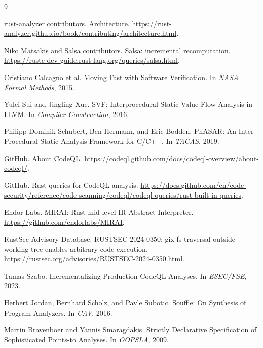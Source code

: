 \documentclass[sigconf,nonacm]{acmart}
\begin{document}
\begin{thebibliography}{9}

rust-analyzer contributors.
\newblock Architecture.
\newblock \url{https://rust-analyzer.github.io/book/contributing/architecture.html}.

Niko Matsakis and Salsa contributors.
\newblock Salsa: incremental recomputation.
\newblock \url{https://rustc-dev-guide.rust-lang.org/queries/salsa.html}.

Cristiano Calcagno et al.
\newblock Moving Fast with Software Verification.
\newblock In \emph{NASA Formal Methods}, 2015.

Yulei Sui and Jingling Xue.
\newblock SVF: Interprocedural Static Value-Flow Analysis in LLVM.
\newblock In \emph{Compiler Construction}, 2016.

Philipp Dominik Schubert, Ben Hermann, and Eric Bodden.
\newblock PhASAR: An Inter-Procedural Static Analysis Framework for C/C++.
\newblock In \emph{TACAS}, 2019.

GitHub.
\newblock About CodeQL.
\newblock \url{https://codeql.github.com/docs/codeql-overview/about-codeql/}.

GitHub.
\newblock Rust queries for CodeQL analysis.
\newblock \url{https://docs.github.com/en/code-security/reference/code-scanning/codeql/codeql-queries/rust-built-in-queries}.

Endor Labs.
\newblock MIRAI: Rust mid-level IR Abstract Interpreter.
\newblock \url{https://github.com/endorlabs/MIRAI}.

RustSec Advisory Database.
\newblock RUSTSEC-2024-0350: gix-fs traversal outside working tree enables
arbitrary code execution.
\newblock \url{https://rustsec.org/advisories/RUSTSEC-2024-0350.html}.

Tamas Szabo.
\newblock Incrementalizing Production CodeQL Analyses.
\newblock In \emph{ESEC/FSE}, 2023.

Herbert Jordan, Bernhard Scholz, and Pavle Subotic.
\newblock Souffle: On Synthesis of Program Analyzers.
\newblock In \emph{CAV}, 2016.

Martin Bravenboer and Yannis Smaragdakis.
\newblock Strictly Declarative Specification of Sophisticated Points-to Analyses.
\newblock In \emph{OOPSLA}, 2009.

\end{thebibliography}
\end{document}
